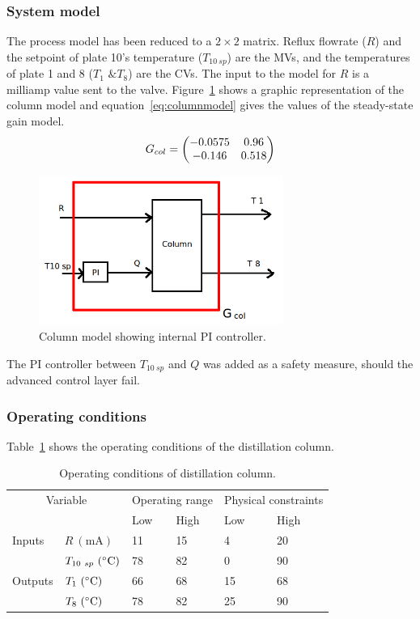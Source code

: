 \subsubsection{System model}
The process model has been reduced to a $2\times2$ matrix.
Reflux flowrate ($R$) and the setpoint of plate 10's temperature ($T_{10~sp}$) are the MVs, and the temperatures of plate 1 and 8 ($T_1\text{ \& }T_{8}$) are the CVs.
The input to the model for $R$ is a milliamp value sent to the valve.
Figure~\ref{fig:columnmodel} shows a graphic representation of the column model and equation~\ref{eq:columnmodel} gives the values of the steady-state gain model.
\begin{equation}
  \label{eq:columnmodel}
  G_{col} = \bpm -0.0575 & 0.96 \\       %
                -0.146  & 0.518 \\ \epm %
\end{equation}
\begin{figure}[htbp]
  \centering
    \includegraphics[width=8cm]{graph/columnmodel}
  \caption[Column model]{Column model showing internal PI controller.}
  \label{fig:columnmodel}
\end{figure}

The PI controller between $T_{10~sp}$ and $Q$ was added as a safety measure, should the advanced control layer fail.

\subsubsection{Operating conditions}
Table~\ref{tab:columnopcon} shows the operating conditions of the distillation column.
\begin{table}[htbp]
  \centering
  \begin{tabular}{llllll}
    \toprule
    \multicolumn{2}{c}{Variable} & \multicolumn{2}{c}{Operating range} & \multicolumn{2}{c}{Physical constraints} \\
    && Low & High & Low & High \\ 
    \midrule
    Inputs &$R~(\text{mA})$          & 11 & 15 & 4 & 20 \\
           &$T_{10~sp}~(^{\circ}\text{{C}})$ & 78 & 82 & 0 & 90 \\[1.3ex]
    Outputs &$T_1~(^{\circ}\text{{C}})$     & 66 & 68 & 15 & 68 \\
            &$T_{8}~(^{\circ}\text{{C}})$   & 78 & 82 & 25 & 90 \\
    \bottomrule
  \end{tabular}
  \caption{Operating conditions of distillation column.}
  \label{tab:columnopcon}
\end{table}


